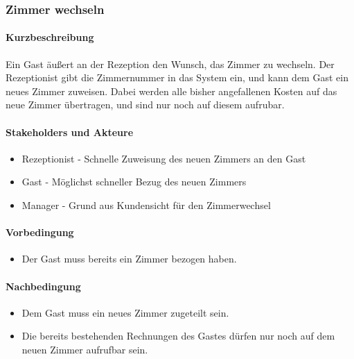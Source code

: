 \subsubsection{Zimmer wechseln}

\paragraph{Kurzbeschreibung}
Ein \Gls{Gast} äußert an der \Gls{Rezeption} den Wunsch, das \Gls{Zimmer} zu wechseln. Der \Gls{Rezeptionist} gibt die Zimmernummer in das System ein, und kann dem \Gls{Gast} ein neues \Gls{Zimmer} zuweisen. Dabei werden alle bisher angefallenen Kosten auf das neue \Gls{Zimmer} übertragen, und sind nur noch auf diesem aufrubar.

\paragraph{Stakeholders und Akteure}
\begin{itemize}
	\item Rezeptionist - Schnelle Zuweisung des neuen \Gls{Zimmer}s an den \Gls{Gast}
	\item Gast - Möglichst schneller Bezug des neuen \Gls{Zimmer}s
	\item Manager - Grund aus Kundensicht für den \Gls{Zimmer}wechsel
\end{itemize}

\paragraph{Vorbedingung}
\begin{itemize}
	\item Der \Gls{Gast} muss bereits ein Zimmer bezogen haben.
\end{itemize}

\paragraph{Nachbedingung}
\begin{itemize}
	\item Dem \Gls{Gast} muss ein neues Zimmer zugeteilt sein.
	\item Die bereits bestehenden Rechnungen des \Gls{Gast}es dürfen nur noch auf dem neuen Zimmer aufrufbar sein.
\end{itemize}

